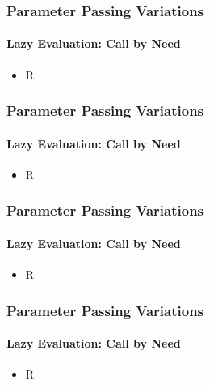 \documentclass{beamer}
\begin{document}
\begin{frame}[fragile]
\frametitle{Parameter Passing Variations}
\framesubtitle{Lazy Evaluation: Call by Need}
\begin{scriptsize}
\begin{itemize}
\item<1-> R

\end{itemize}
\end{scriptsize}
\end{frame}

\begin{frame}[fragile]
\frametitle{Parameter Passing Variations}
\framesubtitle{Lazy Evaluation: Call by Need}
\begin{scriptsize}
\begin{itemize}
\item<1-> R

\end{itemize}
\end{scriptsize}
\end{frame}

\begin{frame}[fragile]
\frametitle{Parameter Passing Variations}
\framesubtitle{Lazy Evaluation: Call by Need}
\begin{scriptsize}
\begin{itemize}
\item<1-> R

\end{itemize}
\end{scriptsize}
\end{frame}

\begin{frame}[fragile]
\frametitle{Parameter Passing Variations}
\framesubtitle{Lazy Evaluation: Call by Need}
\begin{scriptsize}
\begin{itemize}
\item<1-> R

\end{itemize}
\end{scriptsize}
\end{frame}
\end{document}
